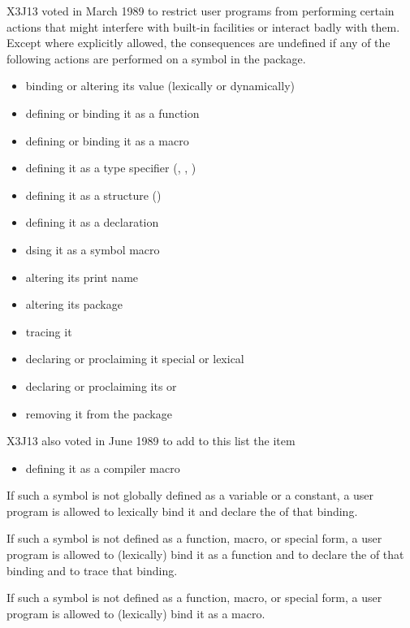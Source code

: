 \begin{newer}
X3J13 voted in March 1989 
to restrict user programs from performing certain actions that
might interfere with built-in facilities or interact badly
with them.
Except where explicitly allowed, the consequences are undefined if any
of the following actions are performed on a symbol in the 
package.
\begin{itemize}
\item binding or altering its value (lexically or dynamically)
\item defining or binding it as a function
\item defining or binding it as a macro
\item defining it as a type specifier (, , )
\item defining it as a structure ()
\item defining it as a declaration
\item dsing it as a symbol macro
\item altering its print name
\item altering its package
\item tracing it
\item declaring or proclaiming it special or lexical
\item declaring or proclaiming its  or 
\item removing it from the package 
\end{itemize}
X3J13 also voted in June 1989 
to add to this list the item
\begin{itemize}
\item defining it as a compiler macro
\end{itemize}

If such a symbol is not globally defined as a variable or a constant,
a user program is allowed to lexically bind it and declare the  of that binding.

If such a symbol is not defined as a function, macro, or special form,
a user program is allowed to (lexically) bind it as a function and to declare the
 of that binding and to trace that binding.

If such a symbol is not defined as a function, macro, or special form,
a user program is allowed to (lexically) bind it as a macro.


\end{newer}
